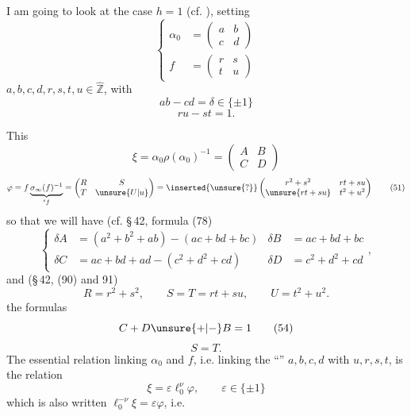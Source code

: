 

I am going to look at the case $h=1$ (cf. ), setting
\[
\left\{\begin{aligned}
 \alpha_0&=\begin{pmatrix}a&b\\c&d\end{pmatrix}\\
 f&=\begin{pmatrix}r&s\\t&u\end{pmatrix}
\end{aligned}\right.
\tag{47}
\]
  $a,b,c,d,r,s,t,u\in\widehat{\mathbb Z}$, with
\[
 \boxed{ab-cd=\delta\in\{\pm1\}}
 \tag{48}
\]
\[
 \boxed{ru-st=1}.
 \tag{49}
\]

This 
\[
 \xi=\alpha_0\rho(\alpha_0)^{-1}
 =\begin{pmatrix}A&B\\C&D\end{pmatrix}
 \tag{50}
\]
\[
 \varphi=f\underbrace{\sigma_\infty(f)^{-1}}_{{}^{t}f}
 =\begin{pmatrix}R&S\\T&\unsure{U|u}\end{pmatrix}
 =\inserted{\unsure{?}}
 \begin{pmatrix}r^2+s^2&rt+su\\\unsure{rt+su}&t^2+u^2\end{pmatrix}
 \tag{51}
\]
so that we will have (cf. \S\,42, formula (78)
\[
\left\{\begin{aligned}
 \delta A&=(a^2+b^2+ab)-(ac+bd+bc)
 &\delta B&=ac+bd+bc\\
 \delta C&=ac+bd+ad-(c^2+d^2+cd)
 &\delta D&=c^2+d^2+cd
\end{aligned}\right.,
\tag{52}
\]
and (\S\,42, (90) and 91)
\[
 R=r^2+s^2,\qquad S=T=rt+su,\qquad U=t^2+u^2.
 \tag{53}
\]
 the formulas
\[
 C+D\unsure{+|-}B=1
 \tag{54}
\]
\[
 S=T.
 \tag{55}
\]
The essential relation linking $\alpha_0$ and $f$, i.e. linking the ``'' $a,b,c,d$ with $u,r,s,t$, is the relation
\[
 \boxed{\xi=\varepsilon\ell_0^\nu\varphi,\qquad\varepsilon\in\{\pm1\}}
 \tag{56}
\]
which is also written $\ell_0^{-\nu}\xi=\varepsilon\varphi$, i.e.
